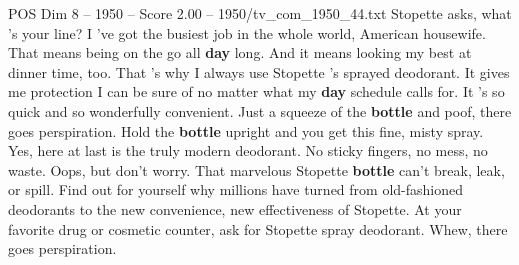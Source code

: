 \begin{textsample}{POS Dim 8 – 1950 – Score 2.00 – 1950/tv\_com\_1950\_44.txt}  \label{ex:f8_pos_015}
Stopette asks, what 's your line?
I 've got the busiest job in the whole world, American housewife.
That means being on the go all \textbf{day} long.
And it means looking my best at dinner time, too.
That 's why I always use Stopette 's sprayed deodorant.
It gives me protection I can be sure of no matter what my \textbf{day} schedule calls for.
It 's so quick and so wonderfully convenient.
Just a squeeze of the \textbf{bottle} and poof, there goes perspiration.
Hold the \textbf{bottle} upright and you get this fine, misty spray.
Yes, here at last is the truly modern deodorant.
No sticky fingers, no mess, no waste.
Oops, but don't worry.
That marvelous Stopette \textbf{bottle} can't break, leak, or spill.
Find out for yourself why millions have turned from old-fashioned deodorants to the new convenience, new effectiveness of Stopette.
At your favorite drug or cosmetic counter, ask for Stopette spray deodorant.
Whew, there goes perspiration.

\end{textsample}
